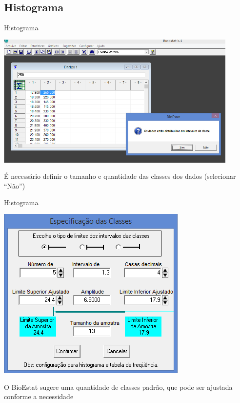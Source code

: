 \documentclass{beamer}
\begin{document}
\subsection{Histograma}

\begin{frame}{Histograma}
  \begin{center}
    \includegraphics[width=0.9\textwidth]{histograma1}
  \end{center}

  É necessário definir o tamanho e quantidade das classes dos dados
  (selecionar ``Não'')
\end{frame}


\begin{frame}{Histograma}
  \begin{center}
    \includegraphics[height=0.7\textheight]{histograma2}
  \end{center}

  O BioEstat sugere uma quantidade de classes padrão, que pode ser
  ajustada conforme a necessidade
\end{frame}
\end{document}

